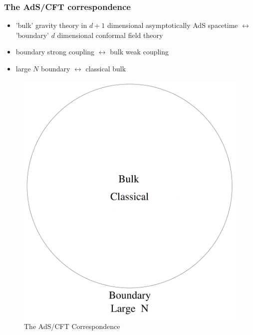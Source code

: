 \documentclass[10pt,aspectratio=169]{beamer}
\begin{document}
\begin{frame}
\frametitle{The AdS/CFT correspondence}

\begin{minipage}[t]{0.48\linewidth}

\begin{itemize}

\item 'bulk' gravity theory in $d+1$ dimensional  asymptotically AdS spacetime $\leftrightarrow$ 'boundary' $d$ dimensional conformal field theory

\item boundary strong coupling $\leftrightarrow$ bulk weak coupling

\item large $N$ boundary $\leftrightarrow$ classical bulk

\end{itemize}

\end{minipage}
%
\hfill
%
\begin{minipage}[t]{0.48\linewidth}

\begin{figure}
    \begin{center}
    
        \includegraphics[scale=0.06]{adscft3}    
    
    \end{center}
    \caption{The AdS/CFT Correspondence}
\end{figure}

\end{minipage}

\end{frame}
\end{document}
